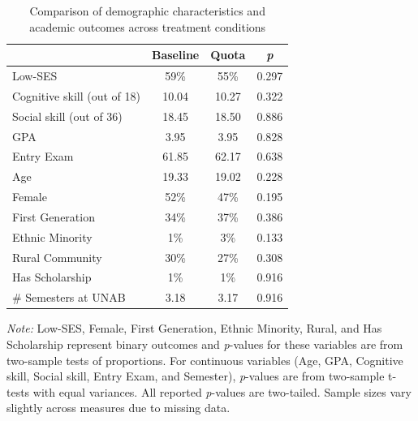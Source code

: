 \documentclass[11pt,a4paper,oneside]{article}
\begin{document}
\begin{table}[!htbp]
\centering
\begin{threeparttable}
\caption{Comparison of demographic characteristics and academic outcomes across treatment conditions}
\begin{tabular*}{0.85\textwidth}{@{\extracolsep{\fill}}lcc c@{}}
\toprule
 & \multicolumn{1}{c}{\textbf{Baseline}} & \multicolumn{1}{c}{\textbf{Quota}} & \multicolumn{1}{c}{\textit{\textbf{p}}} \\ \midrule
Low-SES & 59\% & 55\% & \multicolumn{1}{c}{0.297} \\
Cognitive skill (out of 18) & 10.04 & 10.27 & \multicolumn{1}{c}{0.322} \\
Social skill (out of 36) & 18.45 & 18.50 & \multicolumn{1}{c}{0.886} \\
GPA & 3.95 & 3.95 & \multicolumn{1}{c}{0.828} \\
Entry Exam & 61.85 & 62.17 & \multicolumn{1}{c}{0.638} \\
Age & 19.33 & 19.02 & \multicolumn{1}{c}{0.228} \\
Female & 52\% & 47\% & \multicolumn{1}{c}{0.195} \\
First Generation & 34\% & 37\% & \multicolumn{1}{c}{0.386} \\
Ethnic Minority & 1\% & 3\% & \multicolumn{1}{c}{0.133} \\
Rural Community & 30\% & 27\% & \multicolumn{1}{c}{0.308} \\
Has Scholarship & 1\% & 1\% & \multicolumn{1}{c}{0.916} \\
\# Semesters at UNAB & 3.18 & 3.17 & \multicolumn{1}{c}{0.916} \\
\bottomrule
\end{tabular*}
\begin{tablenotes}[flushleft]
\footnotesize
\item[] \textit{Note:} Low-SES, Female, First Generation, Ethnic Minority, Rural, and Has Scholarship represent binary outcomes and \textit{p}-values for these variables are from two-sample tests of proportions. For continuous variables (Age, GPA, Cognitive skill, Social skill, Entry Exam, and Semester), \textit{p}-values are from two-sample t-tests with equal variances. All reported \textit{p}-values are two-tailed. Sample sizes vary slightly across measures due to missing data.
\end{tablenotes}
\label{tab:demographic-comparison}
\end{threeparttable}
\end{table}
\end{document}

